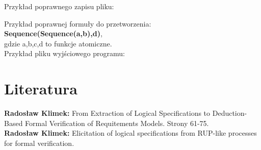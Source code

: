 \documentclass[a4paper, 11pt]{article}
\begin{document}
	
	Przykład poprawnego zapisu pliku:
	

	Przykład poprawnej formuły do przetworzenia:\\
	\textbf{Sequence(Sequence(a,b),d)},\\
	gdzie a,b,c,d to funkcje atomiczne.	\\
	
	Przykład pliku wyjściowego programu:
	
	
	\section{Literatura}
	\textbf{Radosław Klimek:} From Extraction of Logical Specifications to Deduction-Based Formal Verification of Requitements Models. Strony 61-75.\\
		\textbf{Radosław Klimek:} Elicitation of logical specifications from RUP-like processes for formal verification.\\
	
	
	
\end{document}
